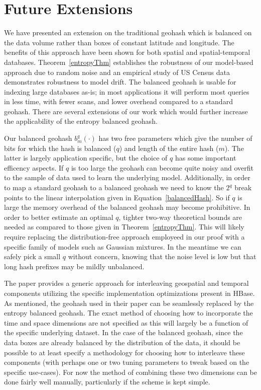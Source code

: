 \documentclass[nips13submit_09,times,art10]{article} %
\begin{document}
\section{Future Extensions}  \label{sec:future}

We have presented an extension on the traditional geohash which is balanced on the data
volume rather than boxes of constant latitude and longitude. The benefits of this approach
have been shown for both spatial and spatial-temporal databases. Theorem~\ref{entropyThm}
establishes the robustness of our model-based approach due to random noise and an empirical
study of US Census data demonstrates robustness to model drift. The balanced geohash is
usable for indexing large databases as-is; in most applications it will perform most queries
in less time, with fewer scans, and lower overhead compared to a standard geohash.
There are several extensions of our work which would further increase the applicability
of the entropy balanced geohash.

Our balanced geohash $b^q_m(\cdot)$ has two free parameters which give the number of bits for which
the hash is balanced ($q$) and length of the entire hash ($m$). The latter is largely
application specific, but the choice of $q$ has some important efficency aspects. If $q$ is
too large the geohash can become quite noisy and overfit to the sample of data used to
learn the underlying model. Additionally, in order to map a standard geohash to a balanced
geohash we need to know the $2^q$ break points to the linear interpolation given in
Equation~\ref{balancedHash}. So if $q$ is large the memory overhead of the balanced
geohash may become prohibitive. In order to better estimate an optimal $q$, tighter two-way
theoretical bounds are needed as compared to those given in Theorem~\ref{entropyThm}. This
will likely require replacing the distribution-free approach employeed in our proof with a
specific family of models such as Gaussian mixtures. In the meantime we can safely pick a
small $q$ without concern, knowing that the noise level is low but that long hash prefixes
may be mildly unbalanced.

The paper \cite{han2013hgrid} provides a generic approach for interleaving geospatial
and temporal components utilizing the specific implementation optimizations present in
HBase. As mentioned, the geohash used in their paper can be seamlessly replaced by the
entropy balanced geohash. The exact method of choosing how to incorporate the time and
space dimensions are not specified as this will largely be a function of the specific
underlying dataset. In the case of the balanced geohash, since the data boxes are
already balanced by the distribution of the data, it should be possible to at least
specify a methodology for choosing how to interleave these components (with perhaps
one or two tuning parameters to tweak based on the specific use-cases). For now the
method of combining these two dimensions can be done fairly well manually, particularly
if the scheme is kept simple.
\end{document}
